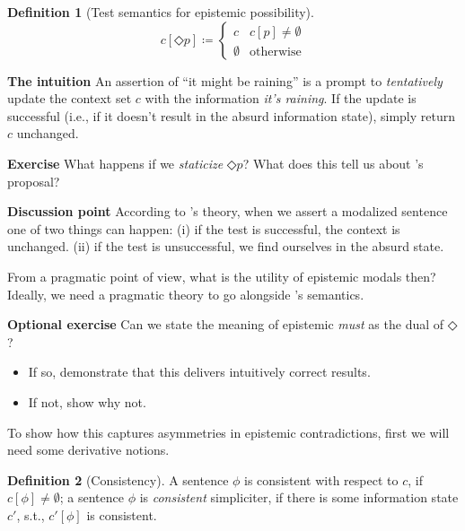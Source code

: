 \documentclass[nols,twoside,nofonts,nobib,nohyper]{tufte-handout}
\theoremstyle{definition}
\newtheorem{definition}{Definition}[section]
\begin{document}
\begin{definition}[Test semantics for epistemic possibility]
  $$
  c[◇ p] ≔ \begin{cases}
    c&c[p] ≠ ∅\\
    ∅&\text{otherwise}
    \end{cases}
  $$
\end{definition}

\begin{tcolorbox}
  \textbf{The intuition}
  \tcblower
  An assertion of \enquote{it might be raining} is a prompt to \textit{tentatively} update the context set $c$ with the information \textit{it's raining}. If the update is successful (i.e., if it doesn't result in the absurd information state), simply return $c$ unchanged.
\end{tcolorbox}

\begin{tcolorbox}
  \textbf{Exercise}
  \tcblower
  What happens if we \textit{staticize} $◇ p$? What does this tell us about \citeauthor{Veltman1996}'s proposal?
\end{tcolorbox}

\begin{tcolorbox}
  \textbf{Discussion point}
  \tcblower
  According to \citeauthor{Veltman1996}'s theory, when we assert a modalized sentence one of two things can happen: (i) if the test is successful, the context is unchanged. (ii) if the test is unsuccessful, we find ourselves in the absurd state.

  From a pragmatic point of view, what is the utility of epistemic modals then? Ideally, we need a pragmatic theory to go alongside \citeauthor{Veltman1996}'s semantics.
\end{tcolorbox}

\begin{tcolorbox}
  \textbf{Optional exercise}
  \tcblower
  Can we state the meaning of epistemic \textit{must} as the dual of $◇$?
  \begin{itemize}
    \item If so, demonstrate that this delivers intuitively correct results.
    \item If not, show why not.
  \end{itemize}

\end{tcolorbox}

To show how this captures asymmetries in epistemic contradictions, first we will need some derivative notions.

\begin{definition}[Consistency]
A sentence $ϕ$ is consistent with respect to $c$, if $c[ϕ] ≠ ∅$; a sentence $ϕ$ is \textit{consistent} simpliciter, if there is some information state $c'$, s.t., $c'[ϕ]$ is consistent.
\end{definition}
\end{document}
